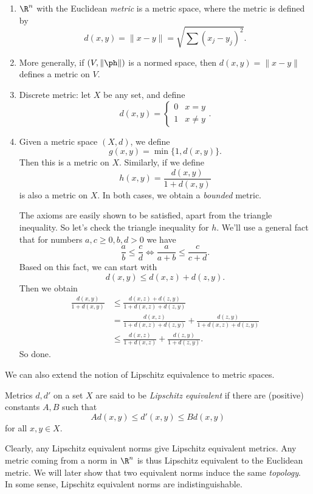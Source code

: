 \documentclass[a4paper]{article}
\begin{document}
\begin{eg}\leavevmode
  \begin{enumerate}
    \item $\R^n$ with the Euclidean \emph{metric} is a metric space, where the metric is defined by
      \[
        d(x, y) = \|x - y\| = \sqrt{\sum (x_j - y_j)^2}.
      \]
    \item More generally, if $(V, \|\ph\|)$ is a normed space, then $d(x, y) = \|x - y\|$ defines a metric on $V$.
    \item Discrete metric: let $X$ be any set, and define
      \[
        d(x, y) =
        \begin{cases}
          0 & x = y\\
          1 & x\not= y
        \end{cases}.
      \]
    \item Given a metric space $(X, d)$, we define
      \[
        g(x, y) = \min\{1, d(x, y)\}.
      \]
      Then this is a metric on $X$. Similarly, if we define
      \[
        h(x, y) = \frac{d(x, y)}{1 + d(x, y)}
      \]
      is also a metric on $X$. In both cases, we obtain a \emph{bounded} metric.

      The axioms are easily shown to be satisfied, apart from the triangle inequality. So let's check the triangle inequality for $h$. We'll use a general fact that for numbers $a, c \geq 0, b, d > 0$ we have
      \[
        \frac{a}{b} \leq \frac{c}{d} \Leftrightarrow \frac{a}{a + b} \leq \frac{c}{c + d}.
      \]
      Based on this fact, we can start with
      \[
        d(x, y) \leq d(x, z) + d(z, y).
      \]
      Then we obtain
      \begin{align*}
        \frac{d(x, y)}{1 + d(x, y)} &\leq \frac{d(x, z) + d(z, y)}{1 + d(x, z) + d(z, y)} \\
        &= \frac{d(x, z)}{1 + d(x, z) + d(z, y)} + \frac{d(z, y)}{1 + d(x, z) + d(z, y)} \\
        &\leq \frac{d(x, z)}{1 + d(x, z)} + \frac{d(z, y)}{1 + d(z, y)}.
      \end{align*}
      So done.
  \end{enumerate}
\end{eg}

We can also extend the notion of Lipschitz equivalence to metric spaces.
\begin{defi}
  Metrics $d, d'$ on a set $X$ are said to be \emph{Lipschitz equivalent} if there are (positive) constants $A, B$ such that
  \[
    A d(x, y) \leq d'(x, y) \leq B d(x, y)
  \]
  for all $x, y \in X$.
\end{defi}
Clearly, any Lipschitz equivalent norms give Lipschitz equivalent metrics. Any metric coming from a norm in $\R^n$ is thus Lipschitz equivalent to the Euclidean metric. We will later show that two equivalent norms induce the same \emph{topology}. In some sense, Lipschitz equivalent norms are indistinguishable.
\end{document}
